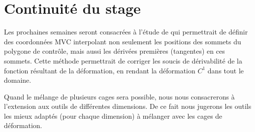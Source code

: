 \def\baselinestretch{1}
\chapter{Continuité du stage}
\ifpdf
\graphicspath{{Conclusions/ConclusionsFigs/PNG/}{Conclusions/ConclusionsFigs/PDF/}{Conclusions/ConclusionsFigs/}}
\else
\graphicspath{{Conclusions/ConclusionsFigs/EPS/}{Conclusions/ConclusionsFigs/}}
\fi


Les prochaines semaines seront consacrées à l'étude de \cite{LS08} qui
permettrait de définir des coordonnées MVC interpolant non seulement
les positions des sommets du polygone de contrôle, mais aussi les
dérivées premières (tangentes) en ces sommets. Cette méthode
permettrait de corriger les soucis de dérivabilité de la fonction
résultant de la déformation, en rendant la déformation $C^1$ dans tout
le domaine.

Quand le mélange de plusieurs cages sera possible, nous nous
consacrerons à l'extension aux outils de différentes dimensions. De ce
fait nous jugerons les outils les mieux adaptés (pour chaque
dimension) à mélanger avec les cages de déformation.



